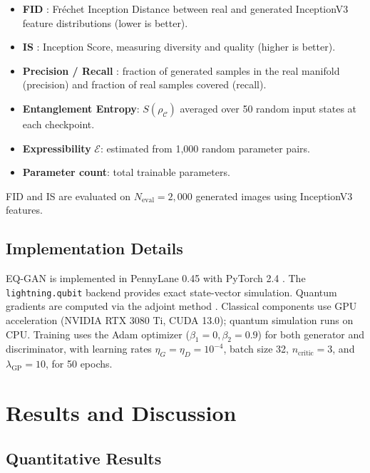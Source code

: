 \documentclass[twocolumn]{article}
\begin{document}
\begin{itemize}
  \item \textbf{FID} \cite{heusel2017gans}: Fréchet Inception Distance between
    real and generated InceptionV3 feature distributions (lower is better).
  \item \textbf{IS} \cite{salimans2016improved}: Inception Score,
    measuring diversity and quality (higher is better).
  \item \textbf{Precision / Recall} \cite{kynkaanniemi2019improved}: fraction
    of generated samples in the real manifold (precision) and fraction of
    real samples covered (recall).
  \item \textbf{Entanglement Entropy}: $S(\rho_\mathcal{C})$ averaged over
    50 random input states at each checkpoint.
  \item \textbf{Expressibility} $\mathcal{E}$: estimated from 1{,}000
    random parameter pairs.
  \item \textbf{Parameter count}: total trainable parameters.
\end{itemize}

FID and IS are evaluated on $N_\text{eval} = 2{,}000$ generated images
using InceptionV3 \cite{szegedy2016rethinking} features.

\subsection{Implementation Details}

EQ-GAN is implemented in PennyLane 0.45 \cite{bergmann2018pennylane} with
PyTorch 2.4 \cite{paszke2019pytorch}. The \texttt{lightning.qubit} backend
provides exact state-vector simulation. Quantum gradients are computed via
the adjoint method \cite{jones2020differentiating}. Classical components use
GPU acceleration (NVIDIA RTX 3080 Ti, CUDA 13.0); quantum simulation runs on
CPU. Training uses the Adam optimizer
($\beta_1 = 0, \beta_2 = 0.9$) for both generator and discriminator, with
learning rates $\eta_G = \eta_D = 10^{-4}$, batch size 32, $n_\text{critic} = 3$,
and $\lambda_\text{GP} = 10$, for 50 epochs.

\section{Results and Discussion}
\label{sec:results}

\subsection{Quantitative Results}
\end{document}
